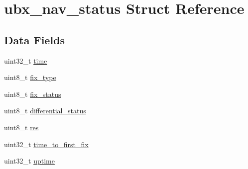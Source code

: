\hypertarget{structubx__nav__status}{\section{ubx\+\_\+nav\+\_\+status Struct Reference}
\label{structubx__nav__status}
}
\subsection*{Data Fields}
\begin{DoxyCompactItemize}
\item 
uint32\+\_\+t \hyperlink{structubx__nav__status_ae9835aa0b5e74605822d52593c9580f1}{time}
\item 
uint8\+\_\+t \hyperlink{structubx__nav__status_ac2afbba014156a4178fc756666e6d221}{fix\+\_\+type}
\item 
uint8\+\_\+t \hyperlink{structubx__nav__status_acd3ec0ce15e37809d2d88816a3157354}{fix\+\_\+status}
\item 
uint8\+\_\+t \hyperlink{structubx__nav__status_ac604bac5db58fe34c0aedfdd019b4b1c}{differential\+\_\+status}
\item 
uint8\+\_\+t \hyperlink{structubx__nav__status_a52766c9f5312cfa71d4916538f3614d7}{res}
\item 
uint32\+\_\+t \hyperlink{structubx__nav__status_a3ce968ea00ae717540935722a271618e}{time\+\_\+to\+\_\+first\+\_\+fix}
\item 
uint32\+\_\+t \hyperlink{structubx__nav__status_ad9313e15a9652678859646360f0dae5a}{uptime}
\end{DoxyCompactItemize}


